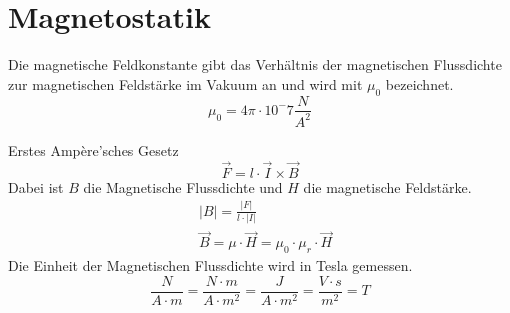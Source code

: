 \section{Magnetostatik}

Die magnetische Feldkonstante gibt das Verhältnis der magnetischen Flussdichte zur magnetischen Feldstärke im Vakuum an und wird mit $\mu_0$ bezeichnet.
\[
	\mu_0 = 4 \pi \cdot 10^-7 \frac{N}{A^2}
\]

Erstes Ampère'sches Gesetz
\[
	\vec{F} = l \cdot \vec{I} \times \vec{B}
\]
Dabei ist $B$ die Magnetische Flussdichte und $H$ die magnetische Feldstärke.
\begin{align*}
	& |B| = \frac{|F|}{l \cdot |I|} \hspace{3em} \\
	& \vec{B} = \mu \cdot \vec{H} = \mu_0 \cdot \mu_r \cdot \vec{H}
\end{align*}
Die Einheit der
Magnetischen Flussdichte wird in Tesla gemessen.
\[
	\frac{N}{A \cdot m}
	= \frac{N \cdot m}{A \cdot m^2}
	= \frac{J}{A \cdot m^2}
	= \frac{V \cdot s}{m^2}
	= T
\]
